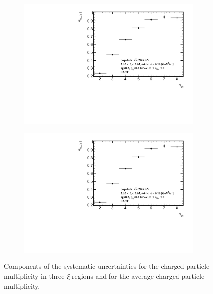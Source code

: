 \begin{figure}[h!]
\begin{subfigure}{.49\textwidth}
		\includegraphics[width=\textwidth,page=101]{chapters/chrgSTAR/img/syst/outSD.pdf}
	\end{subfigure}
	\begin{subfigure}{.49\textwidth}
		\includegraphics[width=\textwidth,page=103]{chapters/chrgSTAR/img/syst/outSD.pdf}
	\end{subfigure}
	\caption{Components of the systematic uncertainties for the charged particle multiplicity in three $\xi$ regions and for the average charged particle multiplicity. }
	\label{fig:results_star_nch_syst}
	\vspace{-1.5cm}
\end{figure}
